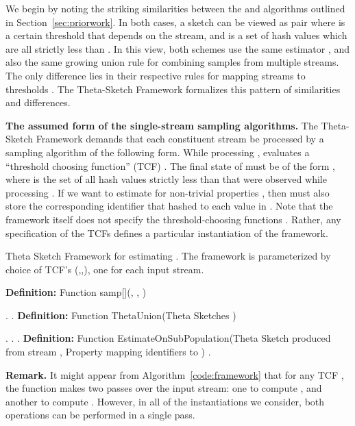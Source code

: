 \documentclass{article}
\newlength\myindent
\newcommand\bindent{\begingroup
  \setlength{\itemindent}{\myindent}
  \addtolength{\algorithmicindent}{\myindent}
}
\newcommand\eindent{\endgroup}
\begin{document}
 We begin by noting the striking similarities between the  and
 algorithms outlined in Section~\ref{sec:priorwork}. 
In both cases, a sketch can be viewed as pair  where  is a certain
threshold that depends on the stream, and  is a set of hash values which are all strictly less than .  
In this view, both schemes use the same estimator , and also the same growing
union rule for combining samples from multiple streams.  The only difference lies in their respective rules for
mapping streams to thresholds . 
The Theta-Sketch Framework
formalizes this pattern of similarities and differences.

\medskip
\noindent \textbf{The assumed form of the single-stream sampling algorithms.}
The Theta-Sketch Framework demands that each constituent stream  be processed by 
a sampling algorithm  of the following form. While processing , 
evaluates a ``threshold choosing function'' (TCF) . The final state of  must be of the form
, where  is the set of all hash values strictly less than  that were observed while processing . If we want to estimate  for non-trivial properties , then 
must also store the corresponding identifier that hashed to each value in .
Note that the framework itself does not specify the threshold-choosing functions . Rather, any specification of the TCFs
 defines a particular instantiation of the framework.

{\small
\begin{algorithm}[t]
{\small
\caption{\small{Theta Sketch Framework for estimating . The framework is parameterized by 
choice of TCF's (,,), one for each input stream.}}\label{code:framework}
\begin{algorithmic}[1]{\footnotesize
\vspace{0.5em}
\STATE \textbf{Definition:} Function samp[](, , )
\bindent
\STATE  
\STATE . \label{code:framework-line-3}
\RETURN .
\eindent
\vspace{0.5em}
\STATE \textbf{Definition:} Function ThetaUnion(Theta Sketches )
\bindent
 \STATE  . 
 \STATE . \label{code:framework-line-7}
 \RETURN .
 \eindent
\vspace{0.5em}
\STATE \textbf{Definition:} Function EstimateOnSubPopulation(Theta Sketch  produced from stream , Property  mapping identifiers to )
\bindent \RETURN  .
\eindent
}\end{algorithmic}
}
\end{algorithm}
}

\medskip
\noindent \textbf{Remark.} It might appear from Algorithm~\ref{code:framework} that for any TCF , the function  makes two passes over the input stream: one to compute , and another to compute .  However, in all of the instantiations we consider, both operations can be performed in a single pass.
\end{document}
